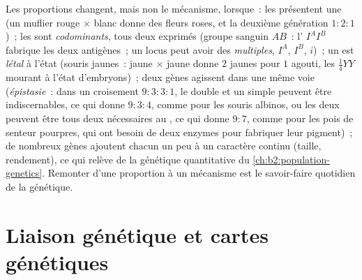 \begin{proposition}\label{prop:b2:meiosis-heredity:extensions}
Les proportions changent, mais non le mécanisme, lorsque~: les 
présentent une \emph{} (un muflier rouge $\times$
blanc donne des fleurs roses, et la deuxième génération $1 : 2 : 1$)~;
les  sont \emph{codominants}, tous deux exprimés (groupe
sanguin $AB$~: l' $I^AI^B$ fabrique les deux antigènes~; un locus
peut avoir des \emph{ multiples}, $I^A$, $I^B$, $i$)~; un 
est \emph{létal} à l'état  (souris jaunes~: jaune $\times$
jaune donne $2$ jaunes pour
$1$ agouti, les $\tfrac14 YY$ mourant à l'état d'embryons)~; deux gènes
agissent dans une même voie (\emph{épistasie}~: dans un croisement
$9 : 3 : 3 : 1$, le double  et un simple  peuvent être
indiscernables, ce qui donne
$9 : 3 : 4$, comme pour les souris albinos, ou les deux 
peuvent être tous deux nécessaires au , ce qui donne $9 : 7$,
comme pour les pois de senteur pourpres, qui ont besoin de deux enzymes
pour fabriquer leur pigment)~; de nombreux gènes ajoutent chacun un peu
à un caractère continu (taille, rendement), ce qui relève de la
génétique quantitative du \cref{ch:b2:population-genetics}. Remonter
d'une proportion à un mécanisme est le savoir-faire quotidien de la
génétique.
\end{proposition}

\section{Liaison génétique et cartes génétiques}


